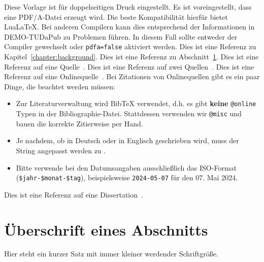 Diese Vorlage ist für doppelseitigen Druck eingestellt.
Es ist voreingestellt, dass eine PDF/A-Datei erzeugt wird.
Die beste Kompatibilität hierfür bietet Lua\LaTeX.
Bei anderen Compilern kann dies entsprechend der Informationen in DEMO-TUDaPub zu Problemen führen.
In diesem Fall sollte entweder der Compiler gewechselt oder \texttt{pdfa=false} aktiviert werden.
Dies ist eine Referenz zu Kapitel~\ref{chapter:background}.
Dies ist eine Referenz zu Abschnitt~\ref{sect:dummy-section}.
Dies ist eine Referenz auf eine Quelle~\cite{Luthmann2017}.
Dies ist eine Referenz auf zwei Quellen~\cite{Luthmann2019,Ruland2018}.
Dies ist eine Referenz auf eine Onlinequelle~\cite{parallel-computing}.
Bei Zitationen von Onlinequellen gibt es ein paar Dinge, die beachtet werden müssen:
\begin{itemize}
	\item Zur Literaturverwaltung wird BibTeX verwendet, d.h. es gibt \textbf{keine} \texttt{@online} Typen in der Bibliographie-Datei. Stattdessen verwenden wir \texttt{@misc} und bauen die korrekte Zitierweise per Hand.
	\item Je nachdem, ob in Deutsch oder in Englisch geschrieben wird, muss der String  angepasst werden zu .
	\item Bitte verwende bei den Datumsangaben ausschließlich das ISO-Format (\texttt{\$jahr-\$monat-\$tag}), beispielsweise \texttt{2024-05-07} für den 07. Mai 2024.
\end{itemize}
Dies ist eine Referenz auf eine Dissertation~\cite{tomaszek_stefan_modellbasierte_2021}.



\section{Überschrift eines Abschnitts}\label{sect:dummy-section}


{\Huge Hier} {\huge steht} {\LARGE ein} {\Large kurzer} {\large Satz} {\normalsize mit} {\small immer} {\footnotesize kleiner} {\scriptsize werdender} {\tiny Schriftgröße}.